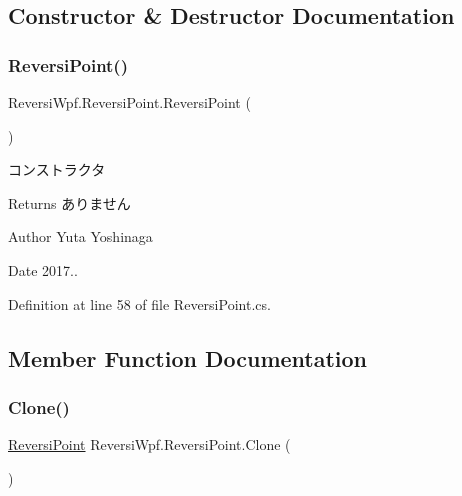 \subsection{Constructor \& Destructor Documentation}
\mbox{\label{class_reversi_wpf_1_1_reversi_point_ae49762ebfdde4cf38173f7e2d97caf56}} 
\subsubsection{\texorpdfstring{Reversi\+Point()}{ReversiPoint()}}
{\footnotesize\ttfamily Reversi\+Wpf.\+Reversi\+Point.\+Reversi\+Point (\begin{DoxyParamCaption}{ }\end{DoxyParamCaption})}



コンストラクタ 

\begin{DoxyReturn}{Returns}
ありません 
\end{DoxyReturn}
\begin{DoxyAuthor}{Author}
Yuta Yoshinaga 
\end{DoxyAuthor}
\begin{DoxyDate}{Date}
2017.. 
\end{DoxyDate}


Definition at line 58 of file Reversi\+Point.\+cs.



\subsection{Member Function Documentation}
\mbox{\label{class_reversi_wpf_1_1_reversi_point_abced863ae8c3a9d22d813e290c0340b0}} 
\subsubsection{\texorpdfstring{Clone()}{Clone()}}
{\footnotesize\ttfamily \hyperlink{class_reversi_wpf_1_1_reversi_point}{Reversi\+Point} Reversi\+Wpf.\+Reversi\+Point.\+Clone (\begin{DoxyParamCaption}{ }\end{DoxyParamCaption})}



